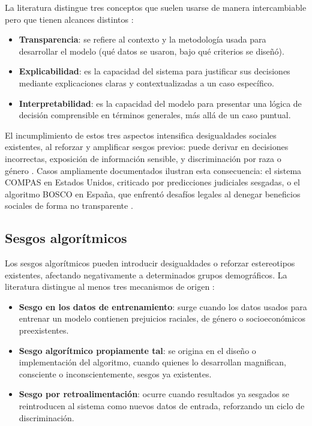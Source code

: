 La literatura distingue tres conceptos que suelen usarse de manera intercambiable pero que tienen alcances distintos \citep{ibm2024transparencia}:

\begin{itemize}
    \item \textbf{Transparencia}: se refiere al contexto y la metodología usada para desarrollar el modelo (qué datos se usaron, bajo qué criterios se diseñó).
    \item \textbf{Explicabilidad}: es la capacidad del sistema para justificar sus decisiones mediante explicaciones claras y contextualizadas a un caso específico.
    \item \textbf{Interpretabilidad}: es la capacidad del modelo para presentar una lógica de decisión comprensible en términos generales, más allá de un caso puntual.
\end{itemize}

El incumplimiento de estos tres aspectos intensifica desigualdades sociales existentes, al reforzar y amplificar sesgos previos: puede derivar en decisiones incorrectas, exposición de información sensible, y discriminación por raza o género \citep{unir2024sesgo}. Casos ampliamente documentados ilustran esta consecuencia: el sistema COMPAS en Estados Unidos, criticado por predicciones judiciales sesgadas, o el algoritmo BOSCO en España, que enfrentó desafíos legales al denegar beneficios sociales de forma no transparente \citep{legalprod,wikipedia_transparencia}.

\subsection{Sesgos algorítmicos}

Los sesgos algorítmicos pueden introducir desigualdades o reforzar estereotipos existentes, afectando negativamente a determinados grupos demográficos. La literatura distingue al menos tres mecanismos de origen \citep{skillnest_sesgo,ibm_iaresponsable}:

\begin{itemize}
    \item \textbf{Sesgo en los datos de entrenamiento}: surge cuando los datos usados para entrenar un modelo contienen prejuicios raciales, de género o socioeconómicos preexistentes.
    \item \textbf{Sesgo algorítmico propiamente tal}: se origina en el diseño o implementación del algoritmo, cuando quienes lo desarrollan magnifican, consciente o inconscientemente, sesgos ya existentes.
    \item \textbf{Sesgo por retroalimentación}: ocurre cuando resultados ya sesgados se reintroducen al sistema como nuevos datos de entrada, reforzando un ciclo de discriminación.
\end{itemize}

